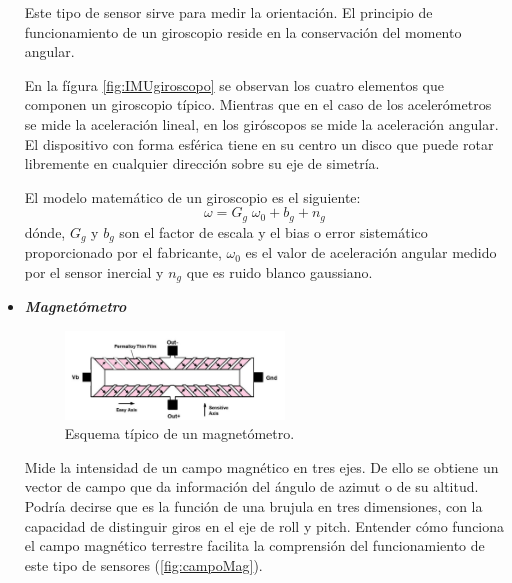 \begin{itemize}
		Este tipo de sensor sirve para medir la orientación. El principio de funcionamiento de un giroscopio reside en la conservación del momento angular. 
		
		En la fígura \ref{fig:IMUgiroscopo} se observan los cuatro elementos que componen un giroscopio típico. Mientras que en el caso de los acelerómetros se mide la aceleración lineal, en los giróscopos se mide la aceleración angular. El dispositivo con forma esférica tiene en su centro un disco que puede rotar libremente en cualquier dirección sobre su eje de simetría. 
				
		
		
		El modelo matemático de un giroscopio es el siguiente:
		\begin{equation}
			\label{eq:modelogiroscopo}
			\omega = G_{g}\; \omega_{0} + b_{g} + n_{g}
		\end{equation}
		dónde, $ G_{g} $ y $ b_{g} $ son el factor de escala y el bias o error sistemático proporcionado por el fabricante, $\omega_{0} $ es el valor de aceleración angular medido por el sensor inercial y $ n_{g} $ que es ruido blanco gaussiano.
		
			
			
			\clearpage
			
		\item \textit{\textbf{Magnetómetro}}	
		\begin{figure}[H]
			\centering
			\includegraphics[width=0.55\textwidth]{./img/IMUmagnetometro}
			\caption{Esquema típico de un magnetómetro. \cite{juanDiego}} 
			\label{fig:IMUmagneto}
		\end{figure} 
		
		Mide la intensidad de un campo magnético en tres ejes. De ello se obtiene un vector de campo que da información del ángulo de azimut o de su altitud. Podría decirse que es la función de una brujula en tres dimensiones, con la capacidad de distinguir giros en el eje de roll y pitch. Entender cómo funciona el campo magnético terrestre facilita la comprensión del funcionamiento de este tipo de sensores (\ref{fig:campoMag}).
		

\end{itemize}
